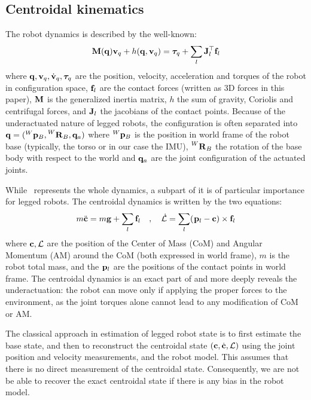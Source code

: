 \subsection{Centroidal kinematics}
The robot dynamics is described by the well-known:
\begin{equation}\label{eq:wbdyn}
  {\bf M}({\bf q}) {\bf v}_q + h({\bf q},{\bf v}_q) = \bm\tau_q + \sum_l {\bf J}_l^{\top} {\bf f}_l
\end{equation}
where ${\bf q},{\bf v}_q,\dot{{\bf v}}_q,\bm\tau_q$ are the position, velocity, acceleration and torques of the robot in configuration space,
${\bf f}_l$ are the contact forces (written as 3D forces in this paper),
${\bf M}$ is the generalized inertia matrix, $h$ the sum of gravity, Coriolis and centrifugal forces, and ${\bf J}_l$ the jacobians of the contact points.
Because of the underactuated nature of legged robots, the configuration is often separated into ${\bf q}=(\prescript{W}{}{{\bf p}}_{B},\prescript{W}{}{{\bf R}}_{B},{\bf q}_a)$ where $\prescript{W}{}{{\bf p}}_{B}$ 
is the position in world frame of the robot base (typically, the torso or in our case the IMU), $\prescript{W}{}{{\bf R}}_{B}$ the rotation of the base body with respect 
to the world and ${\bf q}_a$ are the joint configuration of the actuated joints. 

While~ represents the whole dynamics, a subpart of it is of particular importance for legged robots.
The centroidal dynamics is written by the two equations:
%
\begin{equation}
    m \ddot{{\bf c}} = m {\bf g} + \sum_l {\bf f}_l \quad , \quad
\mathcal{\dot{L}} = \sum_l (\prescript{}{}{{\bf p}}_{l} - {\bf c}) \times {\bf f}_l
\label{eq:NewtonEuler}
\end{equation}
%
where ${\bf c},\mathcal{L}$ are the position of the Center of Mass (CoM) and Angular Momentum (AM) around the CoM (both expressed in world frame), $m$ is the robot total mass, 
and the $\prescript{}{}{{\bf p}}_{l}$ are the positions of the contact points in world frame. The centroidal dynamics is an exact part of  and more deeply reveals 
the underactuation: the robot can move only if applying the proper forces to the environment, as the joint torques alone cannot lead to any modification 
of CoM or AM.


The classical approach in estimation of legged robot state is to first estimate the base state, and then to reconstruct the centroidal state $({\bf c},\dot{{\bf c}},\mathcal{L})$ using the joint position and velocity measurements, and the robot model.
This assumes that there is no direct measurement of the centroidal state.
Consequently, we are not be able to recover the exact centroidal state if there is any bias in the robot model.

